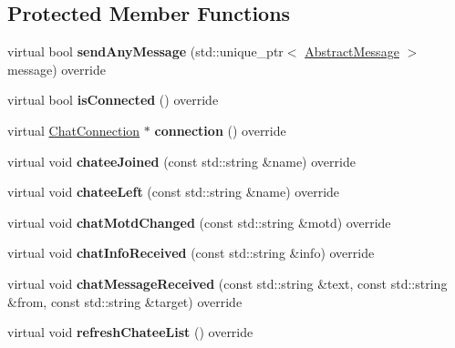 \subsection*{Protected Member Functions}
\begin{DoxyCompactItemize}
\item 
\hypertarget{classSimpleChat_1_1TcpChatClient_ab2f4d6615bdb673a6f754aaff462a967}{virtual bool {\bfseries send\-Any\-Message} (std\-::unique\-\_\-ptr$<$ \hyperlink{classSimpleChat_1_1AbstractMessage}{Abstract\-Message} $>$ message) override}\label{classSimpleChat_1_1TcpChatClient_ab2f4d6615bdb673a6f754aaff462a967}

\item 
\hypertarget{classSimpleChat_1_1TcpChatClient_a05f4734c927c055a6c0a261d6639e55d}{virtual bool {\bfseries is\-Connected} () override}\label{classSimpleChat_1_1TcpChatClient_a05f4734c927c055a6c0a261d6639e55d}

\item 
\hypertarget{classSimpleChat_1_1TcpChatClient_a2ac493213fa789c77acc23b7e03ce535}{virtual \hyperlink{classSimpleChat_1_1ChatConnection}{Chat\-Connection} $\ast$ {\bfseries connection} () override}\label{classSimpleChat_1_1TcpChatClient_a2ac493213fa789c77acc23b7e03ce535}

\item 
\hypertarget{classSimpleChat_1_1TcpChatClient_abc3d3475944f9000fa37af0e74ef1eda}{virtual void {\bfseries chatee\-Joined} (const std\-::string \&name) override}\label{classSimpleChat_1_1TcpChatClient_abc3d3475944f9000fa37af0e74ef1eda}

\item 
\hypertarget{classSimpleChat_1_1TcpChatClient_a0ff71a80179c4d0306fc09ed4a475bcc}{virtual void {\bfseries chatee\-Left} (const std\-::string \&name) override}\label{classSimpleChat_1_1TcpChatClient_a0ff71a80179c4d0306fc09ed4a475bcc}

\item 
\hypertarget{classSimpleChat_1_1TcpChatClient_a1d62652f659ae0a4608ec90f86ac3fea}{virtual void {\bfseries chat\-Motd\-Changed} (const std\-::string \&motd) override}\label{classSimpleChat_1_1TcpChatClient_a1d62652f659ae0a4608ec90f86ac3fea}

\item 
\hypertarget{classSimpleChat_1_1TcpChatClient_a69db86b7aa3a140ad5d7ae108ae90668}{virtual void {\bfseries chat\-Info\-Received} (const std\-::string \&info) override}\label{classSimpleChat_1_1TcpChatClient_a69db86b7aa3a140ad5d7ae108ae90668}

\item 
\hypertarget{classSimpleChat_1_1TcpChatClient_ad554ab47a5e5b5876769af6cf3241665}{virtual void {\bfseries chat\-Message\-Received} (const std\-::string \&text, const std\-::string \&from, const std\-::string \&target) override}\label{classSimpleChat_1_1TcpChatClient_ad554ab47a5e5b5876769af6cf3241665}

\item 
\hypertarget{classSimpleChat_1_1TcpChatClient_a87835c8bcce725938c6dc470a8711232}{virtual void {\bfseries refresh\-Chatee\-List} () override}\label{classSimpleChat_1_1TcpChatClient_a87835c8bcce725938c6dc470a8711232}

\end{DoxyCompactItemize}
